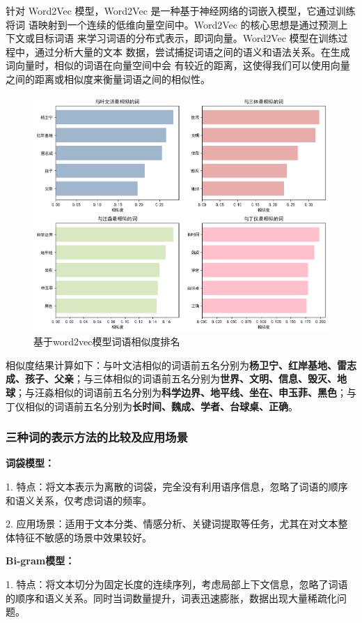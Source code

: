 \documentclass[12pt]{xjtureport}
\begin{document}
针对 Word2Vec 模型，Word2Vec 是一种基于神经网络的词嵌入模型，它通过训练将词
语映射到一个连续的低维向量空间中。Word2Vec 的核心思想是通过预测上下文或目标词语
来学习词语的分布式表示，即词向量。Word2Vec 模型在训练过程中，通过分析大量的文本
数据，尝试捕捉词语之间的语义和语法关系。在生成词向量时，相似的词语在向量空间中会
有较近的距离，这使得我们可以使用向量之间的距离或相似度来衡量词语之间的相似性。

\begin{figure}[!htbp]
    \centering
    \includegraphics[width=0.8\linewidth]{figures/word2vec.png}
    \caption{基于word2vec模型词语相似度排名}
    \label{word2vec}
\end{figure}

相似度结果计算如下：与叶文洁相似的词语前五名分别为\textbf{杨卫宁、红岸基地、雷志成、孩子、父亲}；与三体相似的词语前五名分别为\textbf{世界、文明、信息、毁灭、地球}；与汪淼相似的词语前五名分别为\textbf{科学边界、地平线、坐在、申玉菲、黑色}；与丁仪相似的词语前五名分别为\textbf{长时间、魏成、学者、台球桌、正确}。

\subsubsection{三种词的表示方法的比较及应用场景}

\textbf{词袋模型：}

1.	特点：将文本表示为离散的词袋，完全没有利用语序信息，忽略了词语的顺序和语义关系，仅考虑词语的频率。

2.	应用场景：适用于文本分类、情感分析、关键词提取等任务，尤其在对文本整体特征不敏感的场景中效果较好。

\textbf{Bi-gram模型：}

1.	特点：将文本切分为固定长度的连续序列，考虑局部上下文信息，忽略了词语的顺序和语义关系。同时当词数量提升，词表迅速膨胀，数据出现大量稀疏化问题。
\end{document}
